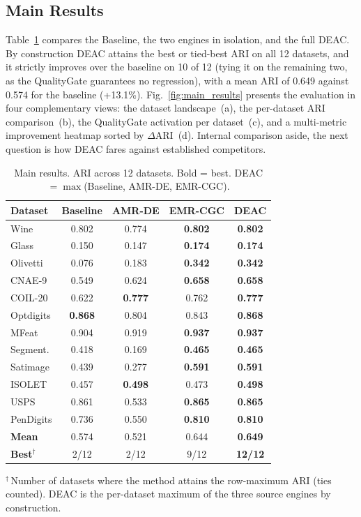 \documentclass[conference]{IEEEtran}
\begin{document}
\subsection{Main Results}

Table~\ref{tab:main_results} compares the Baseline, the two engines in isolation, and the full DEAC. By construction DEAC attains the best or tied-best ARI on all 12 datasets, and it strictly improves over the baseline on 10 of 12 (tying it on the remaining two, as the QualityGate guarantees no regression), with a mean ARI of 0.649 against 0.574 for the baseline (+13.1\%). Fig.~\ref{fig:main_results} presents the evaluation in four complementary views: the dataset landscape~(a), the per-dataset ARI comparison~(b), the QualityGate activation per dataset~(c), and a multi-metric improvement heatmap sorted by $\Delta$ARI~(d). Internal comparison aside, the next question is how DEAC fares against established competitors.

\begin{table}[!t]
\centering
\caption{Main results. ARI across 12 datasets. Bold = best. DEAC $= \max$(Baseline, AMR-DE, EMR-CGC).}
\label{tab:main_results}
\footnotesize
\setlength{\tabcolsep}{4pt}
\begin{tabular}{lcccc}
\toprule
Dataset & Baseline & AMR-DE & EMR-CGC & \textbf{DEAC} \\
\midrule
Wine         & 0.802 & 0.774 & \textbf{0.802} & \textbf{0.802} \\
Glass        & 0.150 & 0.147 & \textbf{0.174} & \textbf{0.174} \\
Olivetti     & 0.076 & 0.183 & \textbf{0.342} & \textbf{0.342} \\
CNAE-9       & 0.549 & 0.624 & \textbf{0.658} & \textbf{0.658} \\
COIL-20      & 0.622 & \textbf{0.777} & 0.762 & \textbf{0.777} \\
Optdigits    & \textbf{0.868} & 0.804 & 0.843 & \textbf{0.868} \\
MFeat        & 0.904 & 0.919 & \textbf{0.937} & \textbf{0.937} \\
Segment.     & 0.418 & 0.169 & \textbf{0.465} & \textbf{0.465} \\
Satimage     & 0.439 & 0.277 & \textbf{0.591} & \textbf{0.591} \\
ISOLET       & 0.457 & \textbf{0.498} & 0.473 & \textbf{0.498} \\
USPS         & 0.861 & 0.533 & \textbf{0.865} & \textbf{0.865} \\
PenDigits    & 0.736 & 0.550 & \textbf{0.810} & \textbf{0.810} \\
\midrule
\textbf{Mean} & 0.574 & 0.521 & 0.644 & \textbf{0.649} \\
\textbf{Best$^\dagger$} & 2/12 & 2/12 & 9/12 & \textbf{12/12} \\
\bottomrule
\end{tabular}

\vspace{2pt}
{\footnotesize $^\dagger$\,Number of datasets where the method attains the row-maximum ARI (ties counted). DEAC is the per-dataset maximum of the three source engines by construction.}
\end{table}
\end{document}
